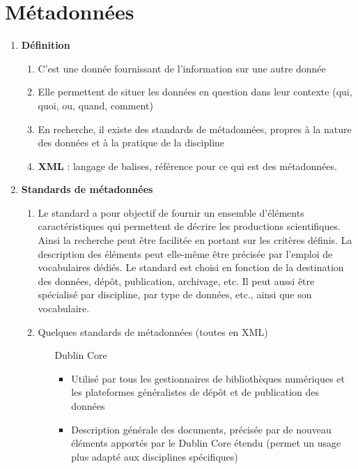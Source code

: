 \documentclass{book}
\begin{document}
\section{Métadonnées}%
\begin{enumerate}
	\item \textbf{Définition}
        \begin{enumerate}
            \item C'est une donnée fournissant de l'information sur une autre donnée
            \item Elle permettent de situer les données en question dans leur contexte (qui, quoi, ou, quand, comment)
            \item En recherche, il existe des standards de métadonnées, propres à la nature des données et à la pratique de la discipline
            \item \textbf{XML} : langage de balises, référence pour ce qui est des métadonnées.
        \end{enumerate}
	\item \textbf{Standards de métadonnées}
    \begin{enumerate}
    \item Le standard a pour objectif de fournir un ensemble d’éléments
    caractéristiques qui permettent de décrire les productions
    scientifiques. Ainsi la recherche peut être facilitée en portant sur
    les critères définis. La description des éléments peut elle-même
    être précisée par l’emploi de vocabulaires dédiés.
    Le standard est choisi en fonction de la destination des données,
    dépôt, publication, archivage, etc. Il peut aussi être spécialisé par
    discipline, par type de données, etc., ainsi que son vocabulaire.
        \item Quelques standards de métadonnées (toutes en XML)
        \begin{enumerate}
            \item [Dublin Core]%
            \begin{itemize}
                \item Utilisé par tous les gestionnaires de bibliothèques numériques et les plateformes généralistes de dépôt et de publication des données
                \item Description générale des documents, précisée par de nouveau éléments apportés par le Dublin Core étendu (permet un usage plus adapté aux disciplines spécifiques)

\end{itemize}
\end{enumerate}
\end{enumerate}
\end{enumerate}
\end{document}
